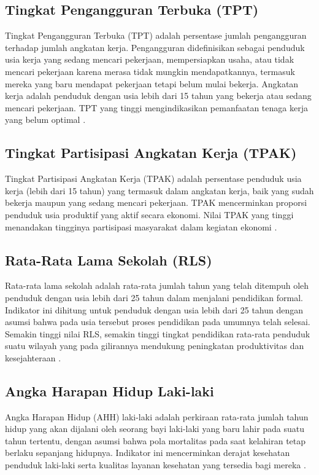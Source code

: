\subsection{\normalsize Tingkat Pengangguran Terbuka (TPT)}
Tingkat Pengangguran Terbuka (TPT) adalah persentase jumlah pengangguran terhadap jumlah angkatan kerja. Pengangguran didefinisikan sebagai penduduk usia kerja yang sedang mencari pekerjaan, mempersiapkan usaha, atau tidak mencari pekerjaan karena merasa tidak mungkin mendapatkannya, termasuk mereka yang baru mendapat pekerjaan tetapi belum mulai bekerja. Angkatan kerja adalah penduduk dengan usia lebih dari 15 tahun yang bekerja atau sedang mencari pekerjaan. TPT yang tinggi mengindikasikan pemanfaatan tenaga kerja yang belum optimal \citep{bpsikr2025, alfia2024}.

\subsection{\normalsize Tingkat Partisipasi Angkatan Kerja (TPAK)}
Tingkat Partisipasi Angkatan Kerja (TPAK) adalah persentase penduduk usia kerja (lebih dari 15 tahun) yang termasuk dalam angkatan kerja, baik yang sudah bekerja maupun yang sedang mencari pekerjaan. TPAK mencerminkan proporsi penduduk usia produktif yang aktif secara ekonomi. Nilai TPAK yang tinggi menandakan tingginya partisipasi masyarakat dalam kegiatan ekonomi \citep{bpsikr2025}.

\subsection{\normalsize Rata-Rata Lama Sekolah (RLS)}
Rata-rata lama sekolah adalah rata-rata jumlah tahun yang telah ditempuh oleh penduduk dengan usia lebih dari 25 tahun dalam menjalani pendidikan formal. Indikator ini dihitung untuk penduduk dengan usia lebih dari 25 tahun dengan asumsi bahwa pada usia tersebut proses pendidikan pada umumnya telah selesai. Semakin tinggi nilai RLS, semakin tinggi tingkat pendidikan rata-rata penduduk suatu wilayah yang pada gilirannya mendukung peningkatan produktivitas dan kesejahteraan \citep{bpsikr2025, alfia2024}.

\subsection{\normalsize Angka Harapan Hidup Laki-laki}
Angka Harapan Hidup (AHH) laki-laki adalah perkiraan rata-rata jumlah tahun hidup yang akan dijalani oleh seorang bayi laki-laki yang baru lahir pada suatu tahun tertentu, dengan asumsi bahwa pola mortalitas pada saat kelahiran tetap berlaku sepanjang hidupnya. Indikator ini mencerminkan derajat kesehatan penduduk laki-laki serta kualitas layanan kesehatan yang tersedia bagi mereka \citep{bpsikr2025, alfia2024}.

